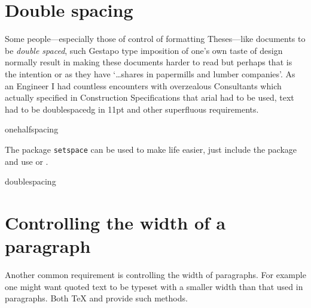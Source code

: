 \section{Double spacing}

Some people---especially those of control of formatting Theses---like documents to be \textit{double spaced}, such Gestapo type imposition of one's own taste of design normally result in making these documents harder to read but perhaps that is the intention or as \cite{Abrahams2003, Wilson2009} they have `\ldots shares in papermills and lumber companies'. As an Engineer I had countless encounters with overzealous Consultants which actually specified in Construction Specifications that arial had to be used, text had to be doublespacedg in 11pt and other superfluous requirements. 

\begin{docCommand}{onehalfspacing}{}
\end{docCommand}
The package \texttt{setspace} \cite{setspace} can be used to make life easier, just include the package and use  or .

\begin{docCommand}{doublespacing}{}
\end{docCommand}

\section{Controlling the width of a paragraph}

Another common requirement is controlling the width of paragraphs. For example one might want quoted text to be typeset with a smaller width than that used in paragraphs. Both TeX and \latexe provide such methods.

